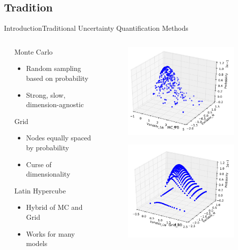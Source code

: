 \documentclass{beamer}
\begin{document}
\subsection{Tradition}
\begin{frame}{Introduction}{Traditional Uncertainty Quantification Methods}\vspace{-10pt}
  \begin{columns}
  \begin{column}{0.1\textwidth}
  \end{column}
  \begin{column}{0.45\textwidth}
    Monte Carlo
      \begin{itemize}
        \item Random sampling based on probability
        \item Strong, slow, dimension-agnostic
      \end{itemize}
    Grid
      \begin{itemize}
        \item Nodes equally spaced by probability
        \item Curse of dimensionality
      \end{itemize}
    Latin Hypercube
      \begin{itemize}
        \item Hybrid of MC and Grid
        \item Works for many models
      \end{itemize}
  \end{column}
  \begin{column}{0.45\textwidth}
    \begin{figure}[h!]
      \centering
      \includegraphics[width=0.4\linewidth]{mc_prob}
    \end{figure}
    \vspace{-10pt}
    \begin{figure}[h!]
      \centering
      \includegraphics[width=0.4\linewidth]{grid_prob}

\end{figure}
\end{column}
\end{columns}
\end{frame}
\end{document}
